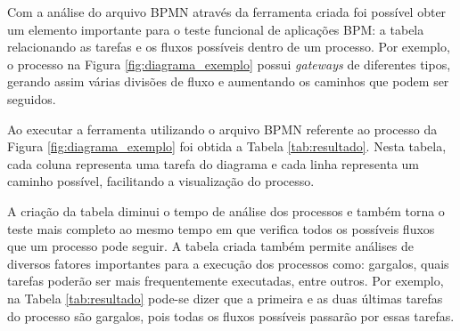 \documentclass[12pt]{article}
\begin{document}
Com a análise do arquivo BPMN através da ferramenta criada foi possível obter um elemento importante para o teste funcional de aplicações BPM: a tabela relacionando as tarefas e os fluxos possíveis dentro de um processo. Por exemplo, o processo na Figura \ref{fig:diagrama_exemplo} possui \emph{gateways} de diferentes tipos, gerando assim várias divisões de fluxo e aumentando os caminhos que podem ser seguidos. 

Ao executar a ferramenta utilizando o arquivo BPMN referente ao processo da Figura  \ref{fig:diagrama_exemplo} foi obtida a Tabela \ref{tab:resultado}. Nesta tabela, cada coluna representa uma tarefa do diagrama e cada linha representa um caminho possível, facilitando a visualização do processo. 

\begin{table}[]
\centering
\caption{Tabela obtida através do arquivo BPMN}
\label{tab:resultado}
\end{table}

A criação da tabela diminui o tempo de análise dos processos e também torna o teste mais completo ao mesmo tempo em que verifica todos os possíveis fluxos que um processo pode seguir. A tabela criada também permite análises de diversos fatores importantes para a execução dos processos como: gargalos, quais tarefas poderão ser mais frequentemente executadas, entre outros. Por exemplo, na Tabela \ref{tab:resultado} pode-se dizer que a primeira e as duas últimas tarefas do processo são gargalos, pois todas os fluxos possíveis passarão por essas tarefas. 
\end{document}
